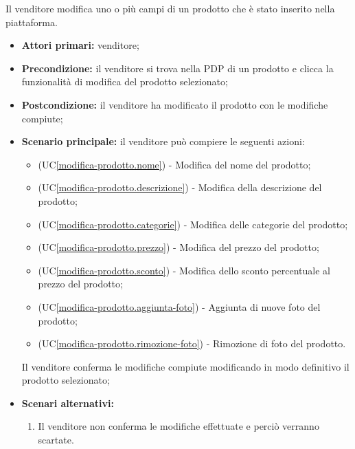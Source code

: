 Il venditore modifica uno o più campi di un prodotto che è stato inserito nella piattaforma.
\begin{itemize}
    \item \textbf{Attori primari:} venditore;
    \item \textbf{Precondizione:} il venditore si trova nella PDP di un prodotto e clicca la funzionalità di modifica del prodotto selezionato;
    \item \textbf{Postcondizione:} il venditore ha modificato il prodotto con le modifiche compiute;
    \item \textbf{Scenario principale:} il venditore può compiere le seguenti azioni:
    \begin{itemize}
        \item (UC\ref{modifica-prodotto.nome}) - Modifica del nome del prodotto;
        \item (UC\ref{modifica-prodotto.descrizione}) - Modifica della descrizione del prodotto;
        \item (UC\ref{modifica-prodotto.categorie}) - Modifica delle categorie del prodotto;
        \item (UC\ref{modifica-prodotto.prezzo}) - Modifica del prezzo del prodotto;
        \item (UC\ref{modifica-prodotto.sconto}) - Modifica dello sconto percentuale al prezzo del prodotto;
        \item (UC\ref{modifica-prodotto.aggiunta-foto}) - Aggiunta di nuove foto del prodotto;
        \item (UC\ref{modifica-prodotto.rimozione-foto}) - Rimozione di foto del prodotto.
    \end{itemize}
    Il venditore conferma le modifiche compiute modificando in modo definitivo il prodotto selezionato;
    \item \textbf{Scenari alternativi:}
    \begin{enumerate}[label=\lett]
    	\item Il venditore non conferma le modifiche effettuate e perciò verranno scartate.
    \end{enumerate}
\end{itemize}

\label{modifica-prodotto.nome}

